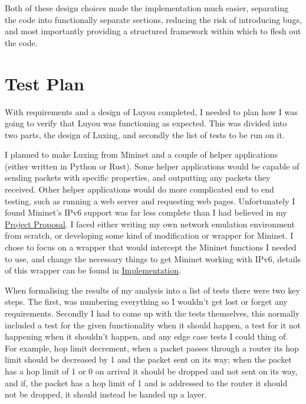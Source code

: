 \documentclass[12pt,a4paper,twoside,openright]{report}
\begin{document}
\bigskip

Both of these design choices made the implementation much easier, separating the code into functionally separate sections, reducing the risk of introducing bugs, and most importantly providing a structured framework within which to flesh out the code.

\section{Test Plan}
\label{sec:test_plan}

With requirements and a design of Luyou completed, I needed to plan how I was going to verify that Luyou was functioning as expected.  This was divided into two parts, the design of Luxing, and secondly the list of tests to be run on it.

\bigskip

I planned to make Luxing from Mininet and a couple of helper applications (either written in Python or Rust).  Some helper applications would be capable of sending packets with specific properties, and outputting any packets they received. Other helper applications would do more complicated end to end testing, such as running a web server and requesting web pages.  Unfortunately I found Mininet's IPv6 support was far less complete than I had believed in my \hyperref[project_proposal]{Project Proposal}.  I faced either writing my own network emulation environment from scratch, or developing some kind of modification or wrapper for Mininet.  I chose to focus on a wrapper that would intercept the Mininet functions I needed to use, and change the necessary things to get Mininet working with IPv6, details of this wrapper can be found in \hyperref[chap::implementation]{Implementation}.

\bigskip

When formalising the results of my analysis into a list of tests there were two key steps. The first,  was numbering everything so I wouldn't get lost or forget any requirements.  Secondly I had to come up with the tests themselves, this normally included a test for the given functionality when it should happen, a test for it not happening when it shouldn't happen, and any edge case tests I could thing of.  For example, hop limit decrement, when a packet passes through a router its hop limit should be decreased by 1 and the packet sent on its way; when the packet has a hop limit of 1 or 0 on arrival it should be dropped and not sent on its way, and if, the packet has a hop limit of 1 and is addressed to the router it should not be dropped, it should instead be handed up a layer. 
\end{document}
